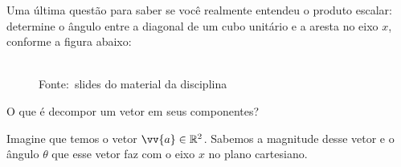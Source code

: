 \documentclass[pdftex, brazil, 12pt, oneside, addpoints]{exam}
\newcommand{\quatrolinhas}{\fillwithlines{1.00in}}
\newcommand{\vetor}[1]{\ensuremath{\vv{#1}}}
\begin{document}
\begin{questions}
\question
Uma última questão para saber se você realmente entendeu o produto
escalar: determine o ângulo entre a diagonal de um cubo unitário e a
aresta no eixo $x$, conforme a figura abaixo:
\begin{figure}[H]
  \begin{center}
    \\
    \footnotesize{Fonte:~slides do material da disciplina}
  \end{center}
\end{figure}




\question
O que é decompor um vetor em seus componentes?
\quatrolinhas

\question
Imagine que temos o vetor $\vetor{a} \in \mathbb{R}^2$. Sabemos 
a magnitude desse vetor e o ângulo $\theta$ que esse vetor faz com o
eixo $x$ no plano cartesiano.
\end{questions}
\end{document}
